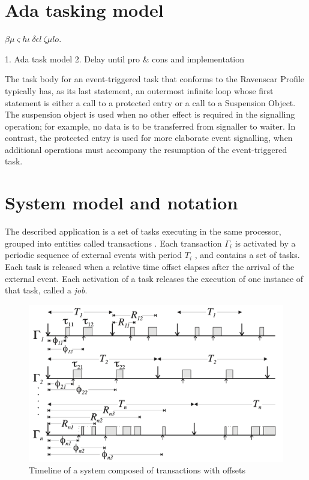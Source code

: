 \documentclass{article}
\begin{document}
\section{Ada tasking model}

$\beta \mu \varsigma h \iota\ \delta \epsilon l\ \zeta \mu l o$.

1. Ada task model
2. Delay until pro \& cons and implementation \cite{absolute-delay}

The task body for an event-triggered task that conforms to the Ravenscar Profile typically has, as its last statement, an outermost infinite loop whose first statement is either a call to a protected entry or a call to a Suspension Object. The suspension object is used when no other effect is required in the signalling operation; for example, no data is to be transferred from signaller to waiter. In contrast, the protected entry is used for more elaborate event signalling, when additional operations must accompany the resumption of the event-triggered task.

\section{System model and notation}\label{model-notation}

The described application is a set of tasks executing in the same processor, grouped into entities called transactions \cite{tindell-offsets}. Each transaction $\Gamma_i$ is activated by a periodic sequence of external events with period $T_i$ , and contains a set of tasks. Each task is released when a relative time offset elapses after the arrival of the external event. Each activation of a task releases the execution of one instance of that task, called a \textit{job}.

\begin{figure}[!htbp]
\centering
\includegraphics[width=5in]{images/transactions}
\caption{Timeline of a system composed of transactions with offsets \cite{pessimistic-rma}}
\label{transactions}
\end{figure}
\end{document}
